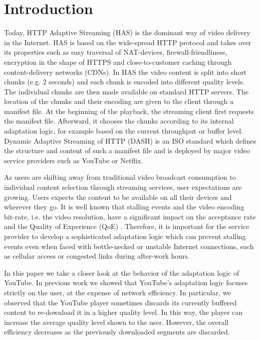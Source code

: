 
\section{Introduction}
\label{sec:introduction}

Today, HTTP Adaptive Streaming (HAS) is the dominant way of video delivery in the Internet. 
HAS is based on the wide-spread HTTP protocol and takes over its properties such as easy traversal of NAT-devices, firewall-friendliness, encryption in the shape of HTTPS and close-to-customer caching through content-delivery networks (CDNs).
In HAS the video content is split into short chunks (e.g. $2$ seconds) and each chunk is encoded into different quality levels.
The individual chunks are then made available on standard HTTP servers.
The location of the chunks and their encoding are given to the client through a manifest file.
At the beginning of the playback, the streaming client first requests the manifest file. 
Afterward, it chooses the chunks according to its internal adaptation logic, for example based on the current throughput or buffer level.
Dynamic Adaptive Streaming of HTTP (DASH) is an ISO standard which defines the structure and content of such a manifest file and is deployed by major video service providers such as YouTube or Netflix.

As users are shifting away from traditional video broadcast consumption to individual content selection through streaming services, user expectations are growing. 
Users expects the content to be available on all their devices and wherever they go. 
It is well known that stalling events and the video encoding bit-rate, i.e. the video resolution, have a significant impact on the acceptance rate and the Quality of Experience (QoE) \cite{casas2012youtube}.
Therefore, it is important for the service provider to develop a sophisticated adaptation logic which can prevent stalling events even when faced with bottle-necked or unstable Internet connections, such as cellular access or congested links during after-work hours.

In this paper we take a closer look at the behavior of the adaptation logic of YouTube.
In previous work we showed that YouTube's adaptation logic focuses strictly on the user, at the expense of network efficiency.
In particular, we observed that the YouTube player sometimes discards its currently buffered content to re-download it in a higher quality level.
In this way, the player can increase the average quality level shown to the user.
However, the overall efficiency decreases as the previously downloaded segments are discarded.

